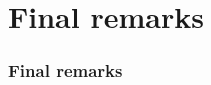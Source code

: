 \documentclass[aspectratio=169]{beamer}
\begin{document}
\section{Final remarks}

\begin{frame}
\frametitle{Final remarks}
\begin{figure}[ht]\centering
{}
\end{figure}
\end{frame}
\end{document}
